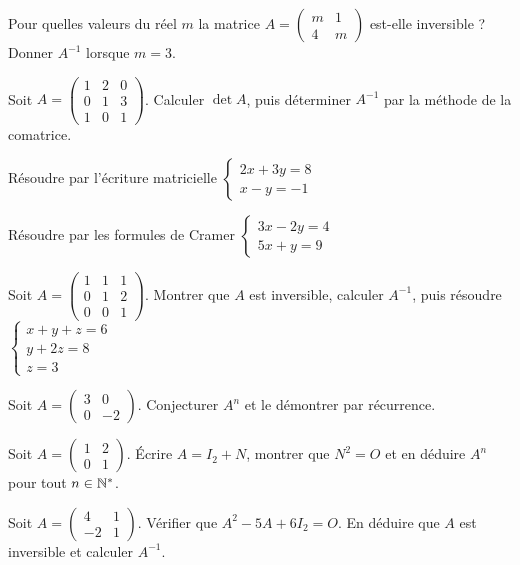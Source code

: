 \exo{} Pour quelles valeurs du réel $m$ la matrice
$A=\begin{pmatrix}m&1\\4&m\end{pmatrix}$ est-elle inversible ? Donner $A^{-1}$ lorsque $m=3$.

\exo{} Soit $A=\begin{pmatrix}1&2&0\\0&1&3\\1&0&1\end{pmatrix}$. Calculer $\det A$, puis
déterminer $A^{-1}$ par la méthode de la comatrice.

\exo{} Résoudre par l'écriture matricielle
$\left\{\begin{array}{l}2x+3y=8\\ x-y=-1\end{array}\right.$

\exo{} Résoudre par les formules de Cramer
$\left\{\begin{array}{l}3x-2y=4\\ 5x+y=9\end{array}\right.$

\exo{} Soit $A=\begin{pmatrix}1&1&1\\0&1&2\\0&0&1\end{pmatrix}$. Montrer que $A$ est
inversible, calculer $A^{-1}$, puis résoudre
$\left\{\begin{array}{l}x+y+z=6\\ y+2z=8\\ z=3\end{array}\right.$

\exo{} Soit $A=\begin{pmatrix}3&0\\0&-2\end{pmatrix}$. Conjecturer $A^n$ et le démontrer par récurrence.

\exo{} Soit $A=\begin{pmatrix}1&2\\0&1\end{pmatrix}$. Écrire $A=I_2+N$, montrer que $N^2=O$
et en déduire $A^n$ pour tout $n\in\mathbb{N}^*$.

\exo{} Soit $A=\begin{pmatrix}4&1\\-2&1\end{pmatrix}$. Vérifier que $A^2-5A+6I_2=O$.
En déduire que $A$ est inversible et calculer $A^{-1}$.

